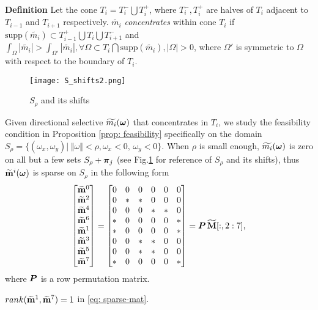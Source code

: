 {\bf Definition} Let the cone $T_i = T_i^-\bigcup T_i^+$, where $T_i^-, T_i^+$ are halves of $T_i$ adjacent  to $T_{i-1}$ and $T_{i+1}$ respectively.  $\widetilde{m_i}$ {\it concentrates} within cone $T_i$ if $\text{supp}(\widetilde{m_i})\subset T_{i-1}^+\bigcup T_i\bigcup T_{i+1}^-$ and $\int_\Omega|\widetilde{m_i}| > \int_{\Omega'}|\widetilde{m_i}|, \forall \Omega\subset T_i\bigcap\text{supp}(\widetilde{m_i}), |\Omega|>0$, where $\Omega'$ is symmetric to $\Omega$ with respect to the boundary of $T_i$.\\[.5em]
\begin{figure}
\centering
\texttt{[image: S\_shifts2.png]}
\caption{$S_{\rho}$ and its shifts}
\label{fig: S-shifts}
\end{figure}
Given directional selective $\widetilde{m_{i}}(\boldsymbol{\omega})$ that concentrates in $T_i$, we study the feasibility condition in Proposition \ref{prop: feasibility} specifically on the domain $S_{\rho} = \{(\omega_x,\omega_y)|\;\Vert\omega\Vert < \rho, \omega_x <0,\,\omega_y<0\}$. When $\rho$ is small enough, $\widetilde{m_{i}}(\boldsymbol{\omega})$ is zero on all but a few sets $S_\rho + \boldsymbol{\pi}_j$ (see Fig.\ref{fig: S-shifts} for reference of $S_\rho$ and its shifts), thus $\widetilde{\mathbf{m}}^{i}(\boldsymbol{\omega})$ is sparse on $S_\rho$ in the following form
\begin{align}
\label{eq: sparse-mat}
\begin{bmatrix}
\widetilde{\mathbf{m}}^{0}\\
\widetilde{\mathbf{m}}^{2}\\
\widetilde{\mathbf{m}}^{4}\\
\widetilde{\mathbf{m}}^{6}\\
\widetilde{\mathbf{m}}^{1}\\
\widetilde{\mathbf{m}}^{3}\\
\widetilde{\mathbf{m}}^{5}\\
\widetilde{\mathbf{m}}^{7}
\end{bmatrix}
=
\begin{bmatrix}
0 & 0 & 0 & 0 & 0 & 0\\
0 & * & * & 0 & 0 & 0\\
0 & 0 & 0 & * & * & 0\\
* & 0 & 0 & 0 & 0 & *\\
* & 0 & 0 & 0 & 0 & *\\
0 & 0 & * & * & 0 & 0\\
0 & 0 & * & * & 0 & 0\\
* & 0 & 0 & 0 & 0 & *
\end{bmatrix}
=\boldsymbol{P}\,\widetilde{\mathbf{M}}[:,2:7],
\end{align}
where $\boldsymbol{P}$ is a row permutation matrix. 
\begin{lemma}\label{lem: rank1}
$rank(\widetilde{\mathbf{m}}^{1},\widetilde{\mathbf{m}}^{7}) = 1$ in \eqref{eq: sparse-mat}.
\end{lemma}
